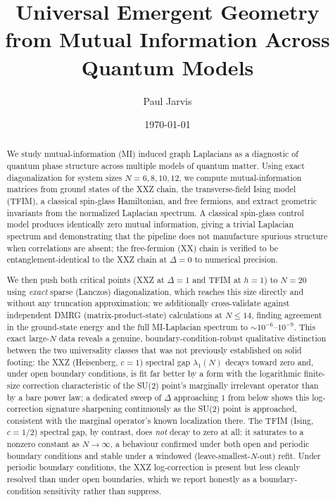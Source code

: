 \documentclass[aps,prx,reprint,amsmath,amssymb,superscriptaddress]{revtex4-2}
\begin{document}
\title{Universal Emergent Geometry from Mutual Information Across Quantum Models}

\author{Paul Jarvis}

\date{\today}

\begin{abstract}
We study mutual-information (MI) induced graph Laplacians as a diagnostic of quantum phase
structure across multiple models of quantum matter. Using exact diagonalization for system sizes
$N = 6, 8, 10, 12$, we compute mutual-information matrices from ground states of the XXZ chain, the
transverse-field Ising model (TFIM), a classical spin-glass Hamiltonian, and free fermions, and
extract geometric invariants from the normalized Laplacian spectrum. A classical spin-glass control
model produces identically zero mutual information, giving a trivial Laplacian spectrum and
demonstrating that the pipeline does not manufacture spurious structure when correlations are
absent; the free-fermion (XX) chain is verified to be entanglement-identical to the XXZ chain at
$\Delta=0$ to numerical precision.

We then push both critical points (XXZ at $\Delta=1$ and TFIM at $h=1$) to $N=20$ using
\emph{exact} sparse (Lanczos) diagonalization, which reaches this size directly and without any
truncation approximation; we additionally cross-validate against independent DMRG (matrix-product-state)
calculations at $N \le 14$, finding agreement in the ground-state energy and the full MI-Laplacian
spectrum to $\sim 10^{-6}$--$10^{-9}$. This exact large-$N$ data reveals a genuine, boundary-condition-robust
qualitative distinction between the two universality classes that was not previously established
on solid footing: the XXZ (Heisenberg, $c=1$) spectral gap $\lambda_1(N)$ decays toward zero and,
under open boundary conditions, is fit far better by a form with the logarithmic finite-size correction
characteristic of the SU(2) point's marginally irrelevant operator than by a bare power law; a dedicated
sweep of $\Delta$ approaching $1$ from below shows this log-correction signature sharpening
continuously as the SU(2) point is approached, consistent with the marginal operator's known
localization there. The TFIM (Ising, $c=1/2$) spectral gap, by contrast, does \emph{not} decay to
zero at all: it saturates to a nonzero constant as $N\to\infty$, a behaviour confirmed under both
open and periodic boundary conditions and stable under a windowed (leave-smallest-$N$-out) refit.
Under periodic boundary conditions, the XXZ log-correction is present but less cleanly resolved than
under open boundaries, which we report honestly as a boundary-condition sensitivity rather than
suppress.


\end{abstract}
\end{document}
